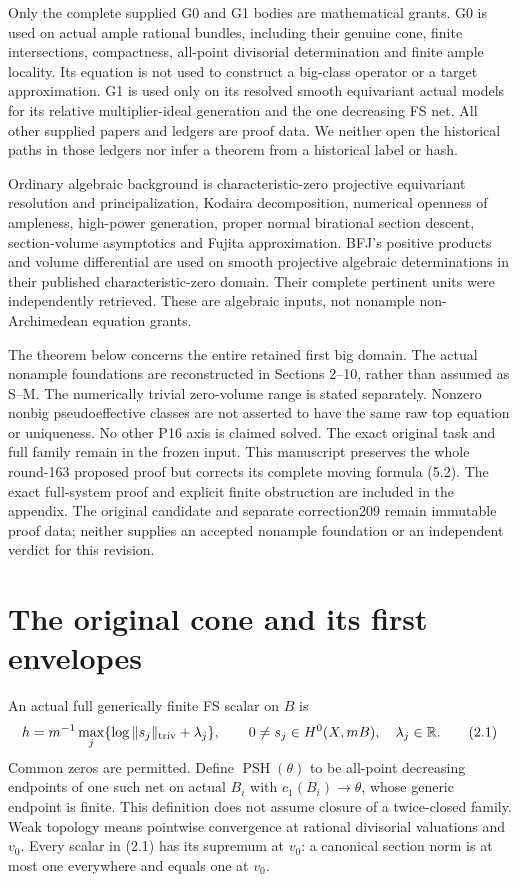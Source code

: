 \documentclass[10pt]{article}
\newcommand{\PSH}{\operatorname{PSH}}
\begin{document}
Only the complete supplied G0 and G1 bodies are mathematical grants.
G0 is used on actual ample rational bundles, including their genuine cone,
finite intersections, compactness, all-point divisorial determination and
finite ample locality. Its equation is not used to construct a big-class
operator or a target approximation. G1 is used only on its resolved smooth
equivariant actual models for its relative multiplier-ideal generation and
the one decreasing FS net. All other supplied papers and ledgers are proof
data. We neither open the historical paths in those ledgers nor infer a
theorem from a historical label or hash.

Ordinary algebraic background is characteristic-zero projective equivariant
resolution and principalization, Kodaira decomposition, numerical openness
of ampleness, high-power generation, proper normal birational section
descent, section-volume asymptotics and Fujita approximation. BFJ's
positive products and volume differential are used on smooth projective
algebraic determinations in their published characteristic-zero domain.
Their complete pertinent units were independently retrieved. These are
algebraic inputs, not nonample non-Archimedean equation grants.

The theorem below concerns the entire retained first big domain.
The actual nonample foundations are reconstructed in Sections 2--10,
rather than assumed as S--M. The numerically trivial zero-volume
range is stated separately. Nonzero nonbig pseudoeffective classes
are not asserted to have the same raw top equation or uniqueness.
No other P16 axis is claimed solved. The exact original task and full
family remain in the frozen input.
This manuscript preserves the whole round-163 proposed proof but corrects
its complete moving formula (5.2). The exact full-system proof and explicit
finite obstruction are included in the appendix. The original candidate
and separate correction209 remain immutable proof data; neither supplies
an accepted nonample foundation or an independent verdict for this revision.

\section{The original cone and its first envelopes}
An actual full generically finite FS scalar on $B$ is
\[
 h=m^{-1}\max_j\{\log\|s_j\|_{\rm triv}+\lambda_j\},
 \qquad 0\ne s_j\in H^0(X,mB),\quad\lambda_j\in\mathbb R.
 \tag{2.1}
\]
Common zeros are permitted. Define $\PSH(\theta)$ to be all-point
decreasing endpoints of one such net on actual $B_i$ with
$c_1(B_i)\to\theta$, whose generic endpoint is finite. This definition
does not assume closure of a twice-closed family. Weak topology means
pointwise convergence at rational divisorial valuations and $v_0$.
Every scalar in (2.1) has its supremum at $v_0$: a canonical section norm
is at most one everywhere and equals one at $v_0$.
\end{document}
